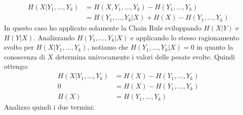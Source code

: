 \documentclass{article}
\begin{document}
\begin{enumerate}[(a)]
\begin{equation}
    \begin{split}
        H(X|Y_1, ... , Y_k) &= H(X,Y_1, ... , Y_k) - H(Y_1, ... , Y_k)\\
                            &= H(Y_1, ... , Y_k|X) + H(X) - H(Y_1, ... , Y_k)
    \end{split} 
    \end{equation}
    In questo caso ho applicato solamente la Chain Rule sviluppando $H(X|Y)$ e $H(Y|X)$. Analizzando $H(Y_1, ... , Y_k|X)$ e applicando lo stesso ragionamento svolto per $H(X|Y_1, ... , Y_k)$, notiamo che $H(Y_1, ... , Y_k|X) = 0$ in quanto la conoscenza di $X$ determina univocamente i valori delle pesate svolte. Quindi ottengo:
    \begin{equation}
    \begin{split}
        H(X|Y_1, ... , Y_k) &= H(X) - H(Y_1, ... , Y_k)\\
                          0 &= H(X) - H(Y_1, ... , Y_k)\\
                          H(X) &= H(Y_1, ... , Y_k)
    \end{split} 
    \end{equation}
    Analizzo quindi i due termini:
    

\end{enumerate}
\end{document}
